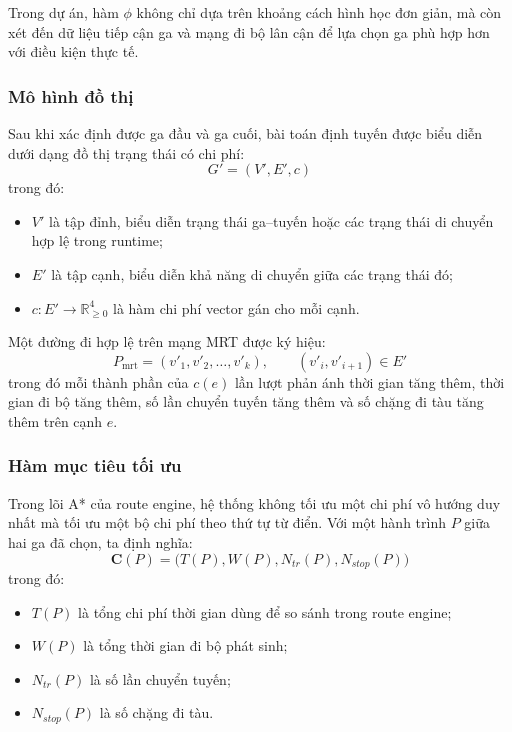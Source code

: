 \documentclass[../DoAn.tex]{subfiles}
\begin{document}
Trong dự án, hàm $\phi$ không chỉ dựa trên khoảng cách hình học đơn giản, mà còn xét đến dữ liệu tiếp cận ga và mạng đi bộ lân cận để lựa chọn ga phù hợp hơn với điều kiện thực tế.

\subsubsection{Mô hình đồ thị}
Sau khi xác định được ga đầu và ga cuối, bài toán định tuyến được biểu diễn dưới dạng đồ thị trạng thái có chi phí:
\[
G' = (V', E', c)
\]
trong đó:
\begin{itemize}
    \item $V'$ là tập đỉnh, biểu diễn trạng thái ga--tuyến hoặc các trạng thái di chuyển hợp lệ trong runtime;
    \item $E'$ là tập cạnh, biểu diễn khả năng di chuyển giữa các trạng thái đó;
    \item $c : E' \rightarrow \mathbb{R}_{\ge 0}^{4}$ là hàm chi phí vector gán cho mỗi cạnh.
\end{itemize}

Một đường đi hợp lệ trên mạng MRT được ký hiệu:
\[
P_{\text{mrt}} = (v'_1, v'_2, \dots, v'_k), \qquad (v'_i, v'_{i+1}) \in E'
\]
trong đó mỗi thành phần của $c(e)$ lần lượt phản ánh thời gian tăng thêm, thời gian đi bộ tăng thêm, số lần chuyển tuyến tăng thêm và số chặng đi tàu tăng thêm trên cạnh $e$.

\subsubsection{Hàm mục tiêu tối ưu}
Trong lõi A* của route engine, hệ thống không tối ưu một chi phí vô hướng duy nhất mà tối ưu một bộ chi phí theo thứ tự từ điển. Với một hành trình $P$ giữa hai ga đã chọn, ta định nghĩa:
\[
\mathbf{C}(P) = \bigl(T(P), W(P), N_{tr}(P), N_{stop}(P)\bigr)
\]
trong đó:
\begin{itemize}
    \item $T(P)$ là tổng chi phí thời gian dùng để so sánh trong route engine;
    \item $W(P)$ là tổng thời gian đi bộ phát sinh;
    \item $N_{tr}(P)$ là số lần chuyển tuyến;
    \item $N_{stop}(P)$ là số chặng đi tàu.
\end{itemize}
\end{document}
